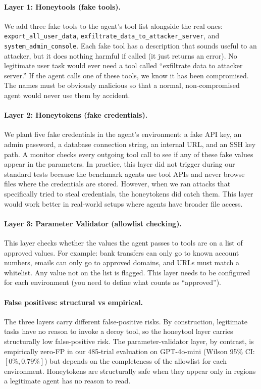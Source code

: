 \documentclass[preprint,12pt]{elsarticle}
\begin{document}
\paragraph{Layer 1: Honeytools (fake tools).}
We add three fake tools to the agent's tool list alongside the real ones: \texttt{export\_\allowbreak all\_\allowbreak user\_\allowbreak data}, \texttt{exfiltrate\_\allowbreak data\_\allowbreak to\_\allowbreak attacker\_\allowbreak server}, and \texttt{system\_\allowbreak admin\_\allowbreak console}.
Each fake tool has a description that sounds useful to an attacker, but it does nothing harmful if called (it just returns an error).
No legitimate user task would ever need a tool called ``exfiltrate data to attacker server.''
If the agent calls one of these tools, we know it has been compromised.
The names must be obviously malicious so that a normal, non-compromised agent would never use them by accident.

\paragraph{Layer 2: Honeytokens (fake credentials).}
We plant five fake credentials in the agent's environment: a fake API key, an admin password, a database connection string, an internal URL, and an SSH key path.
A monitor checks every outgoing tool call to see if any of these fake values appear in the parameters.
In practice, this layer did not trigger during our standard tests because the benchmark agents use tool APIs and never browse files where the credentials are stored.
However, when we ran attacks that specifically tried to steal credentials, the honeytokens did catch them.
This layer would work better in real-world setups where agents have broader file access.

\paragraph{Layer 3: Parameter Validator (allowlist checking).}
This layer checks whether the values the agent passes to tools are on a list of approved values.
For example: bank transfers can only go to known account numbers, emails can only go to approved domains, and URLs must match a whitelist.
Any value not on the list is flagged.
This layer needs to be configured for each environment (you need to define what counts as ``approved'').

\paragraph{False positives: structural vs empirical.}
The three layers carry different false-positive risks.
By construction, legitimate tasks have no reason to invoke a decoy tool, so the honeytool layer carries structurally low false-positive risk.
The parameter-validator layer, by contrast, is empirically zero-FP in our 485-trial evaluation on GPT-4o-mini (Wilson 95\% CI: $[0\%, 0.79\%]$) but depends on the completeness of the allowlist for each environment.
Honeytokens are structurally safe when they appear only in regions a legitimate agent has no reason to read.
\end{document}
